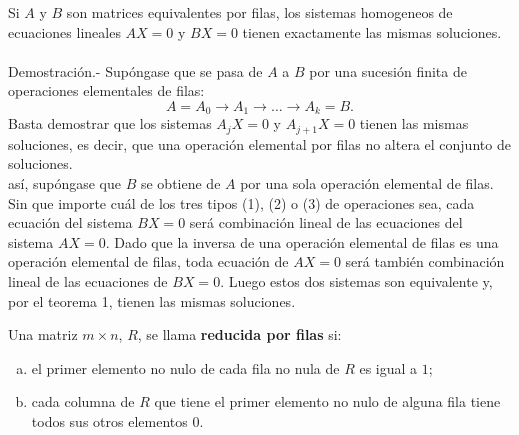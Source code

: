 \begin{teo}
    Si $A$ y $B$ son matrices equivalentes por filas, los sistemas homogeneos de ecuaciones lineales $AX=0$ y $BX=0$ tienen exactamente las mismas soluciones.\\\\
	Demostración.-\; Supóngase que se pasa de $A$ a $B$ por una sucesión finita de operaciones elementales de filas:
	$$A=A_0\to A_1 \to \ldots \to A_k = B.$$
	Basta demostrar que los sistemas $A_jX=0$ y $A_{j+1}X=0$ tienen las mismas soluciones, es decir, que una operación elemental por filas no altera el conjunto de soluciones.\\
	así, supóngase que $B$ se obtiene de $A$ por una sola operación elemental de filas. Sin que importe cuál de los tres tipos (1), (2) o (3) de operaciones sea, cada ecuación del sistema $BX=0$ será combinación lineal de las ecuaciones del sistema $AX=0$. Dado que la inversa de una operación elemental de filas es una operación elemental de filas, toda ecuación de $AX=0$ será también combinación lineal de las ecuaciones de $BX=0$. Luego estos dos sistemas son equivalente y, por el teorema 1, tienen las mismas soluciones.
\end{teo}

\begin{tcolorbox}
    \begin{def.}
	Una matriz $m\times n$, $R$, se llama \textbf{reducida por filas} si:
	\begin{enumerate}[(a)]
	    \item el primer elemento no nulo de cada fila no nula de $R$ es igual a $1$;
	    \item cada columna de $R$ que tiene el primer elemento no nulo de alguna fila tiene todos sus otros elementos $0$.
	\end{enumerate}
    \end{def.}
\end{tcolorbox}


